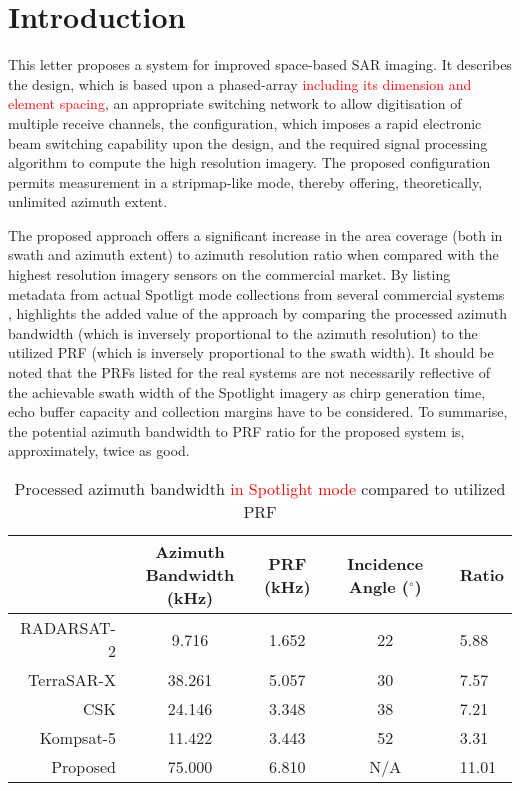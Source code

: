 \documentclass[journal]{IEEEtran}
\newcommand{\cg}[1]{\textcolor{red}{#1}}
\begin{document}
\section{Introduction}
This letter proposes a system for improved space-based SAR imaging. It describes the design, which is based upon a phased-array \cg{including its dimension and element spacing},
an appropriate switching network to allow digitisation of multiple receive channels, the configuration,
which imposes a rapid electronic beam switching capability upon the design, and the required signal processing algorithm to compute the high resolution imagery. The proposed configuration permits measurement in a stripmap-like mode, thereby offering, theoretically, unlimited azimuth extent. 
\par
The proposed approach offers a significant increase in the area coverage (both in swath and azimuth extent) to azimuth resolution ratio when compared with the highest resolution imagery sensors on the commercial market. By listing metadata from actual Spotligt mode collections from several commercial systems \cite{Brautigam2010, Fox2004, Porfilio2016, Mittermayer},  highlights the added value of the approach by comparing the processed azimuth bandwidth (which is inversely proportional to the azimuth resolution) to the utilized PRF (which is inversely proportional to the swath width). It should be noted that the PRFs listed for the real systems are not necessarily reflective of the achievable swath width of the Spotlight imagery as chirp generation time, echo buffer capacity and collection margins have to be considered. To summarise, the potential azimuth bandwidth to PRF ratio for the proposed system is, approximately, twice as good. 
\begin{table}[h!]
 \begin{center}
 \caption{Processed azimuth bandwidth \cg{in Spotlight mode} compared to utilized PRF}
  \begin{tabular}{r|c|c|c|l}
   & \thead{\bf Azimuth \\ Bandwidth (kHz)} & \thead{\bf PRF \\(kHz)} & \thead{\bf Incidence \\Angle ($^\circ$)} & {\bf Ratio}\\\hline
   RADARSAT-2 & 9.716 & 1.652 & 22 & 5.88\\\hline
   TerraSAR-X & 38.261 & 5.057 & 30 & 7.57\\\hline
   CSK & 24.146 & 3.348 & 38 & 7.21\\\hline
   Kompsat-5 & 11.422 & 3.443 & 52 & 3.31\\\hline
   Proposed & 75.000 & 6.810 & N/A & 11.01
  \end{tabular}
  \label{tb:reswidth}
 \end{center}
\end{table}
\end{document}
